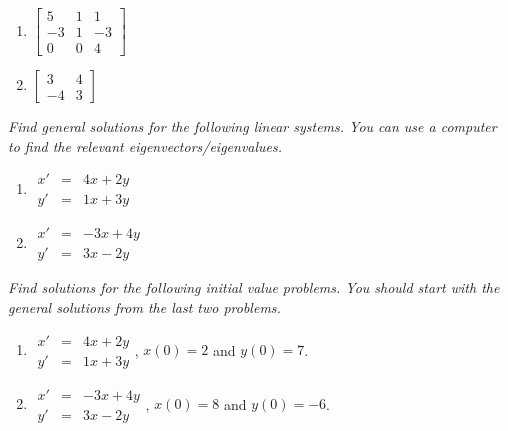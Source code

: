 \documentclass[10pt]{article}
\begin{document}
\begin{multicols}{2}
\begin{enumerate}
\setcounter{enumi}{\theenumCount}
\item $\begin{bmatrix} 5 & 1 & 1 \\ -3 & 1 & -3 \\ 0 & 0 & 4 \end{bmatrix}$


\item $\begin{bmatrix} 3 & 4 \\ -4 & 3 \end{bmatrix}$

\setcounter{enumCount}{\theenumi}
\end{enumerate} 
\end{multicols}
\vfill

\noindent
\textit{Find general solutions for the following linear systems.  You can use a computer to find the relevant eigenvectors/eigenvalues.}

\begin{multicols}{2}
\begin{enumerate}
\setcounter{enumi}{\theenumCount}

\item $\begin{array}{ccc} x' & = & 4x + 2y \\ y' & = & 1x + 3y \end{array}$

\item $\begin{array}{ccc} x' & = & -3x + 4y \\ y' & = & 3x - 2y \end{array}$

\setcounter{enumCount}{\theenumi}
\end{enumerate} 
\end{multicols}
\vfill

\noindent
\textit{Find solutions for the following initial value problems. You should start with the general solutions from the last two problems. }

\begin{multicols}{2}
\begin{enumerate}
\setcounter{enumi}{\theenumCount}

\item $\begin{array}{ccc} x' & = & 4x + 2y \\ y' & = & 1x + 3y \end{array}$, $x(0) = 2$ and $y(0) = 7$. 

\item $\begin{array}{ccc} x' & = & -3x + 4y \\ y' & = & 3x - 2y \end{array}$, $x(0) = 8$ and $y(0) = -6$. 

\setcounter{enumCount}{\theenumi}
\end{enumerate} 
\end{multicols}
\vfill
\end{document}
